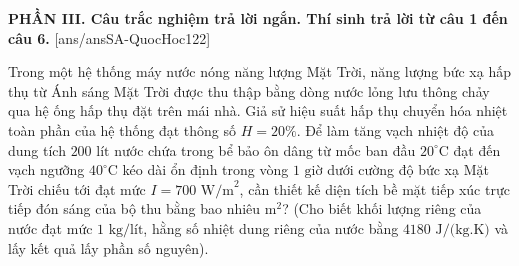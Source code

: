 
\noindent \textbf{PHẦN III. Câu trắc nghiệm trả lời ngắn. Thí sinh trả lời từ câu 1 đến câu 6.}
[ans/ansSA-QuocHoc122]

\begin{ex}	Trong một hệ thống máy nước nóng năng lượng Mặt Trời, năng lượng bức xạ hấp thụ từ Ánh sáng Mặt Trời được thu thập bằng dòng nước lỏng lưu thông chảy qua hệ ống hấp thụ đặt trên mái nhà. Giả sử hiệu suất hấp thụ chuyển hóa nhiệt toàn phần của hệ thống đạt thông số $H = 20\%$. Để làm tăng vạch nhiệt độ của dung tích $200\text{ lít}$ nước chứa trong bể bảo ôn dâng từ mốc ban đầu $20^\circ\text{C}$ đạt đến vạch ngưỡng $40^\circ\text{C}$ kéo dài ổn định trong vòng $1\text{ giờ}$ dưới cường độ bức xạ Mặt Trời chiếu tới đạt mức $I = 700\text{ W/m}^2$, cần thiết kế diện tích bề mặt tiếp xúc trực tiếp đón sáng của bộ thu bằng bao nhiêu $\text{m}^2$? (Cho biết khối lượng riêng của nước đạt mức $1\text{ kg/lít}$, hằng số nhiệt dung riêng của nước bằng $4180\text{ J/(kg.K)}$ và lấy kết quả lấy phần số nguyên).

	\par{}
\end{ex}

